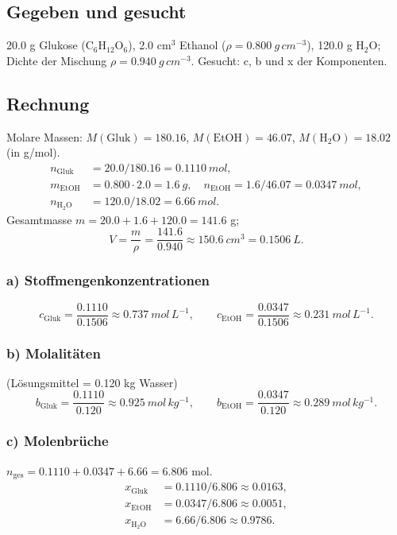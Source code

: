 
\subsection*{Gegeben und gesucht}
20.0 g Glukose (C$_6$H$_{12}$O$_6$), 2.0 cm$^3$ Ethanol
($\rho=0.800\ g\,cm^{-3}$), 120.0 g H$_2$O; Dichte der Mischung
$\rho=0.940\ g\,cm^{-3}$. Gesucht: c, b und x der Komponenten.

\subsection*{Rechnung}
Molare Massen: $M(\text{Gluk}){=}180.16$, $M(\text{EtOH}){=}46.07$,
$M(\text{H}_2\text{O}){=}18.02$ (in g/mol).
\begin{align*}
n_{\text{Gluk}} &= 20.0/180.16 = 0.1110\ mol,\\
m_{\text{EtOH}} &= 0.800\cdot2.0 = 1.6\ g,
  \quad n_{\text{EtOH}} = 1.6/46.07 = 0.0347\ mol,\\
n_{\text{H}_2\text{O}} &= 120.0/18.02 = 6.66\ mol.
\end{align*}
Gesamtmasse $m=20.0+1.6+120.0 = 141.6$ g;
\[
  V = \frac{m}{\rho} = \frac{141.6}{0.940} \approx 150.6\ cm^3
    = 0.1506\ L.
\]

\subsubsection*{a) Stoffmengenkonzentrationen}
\[
  c_{\text{Gluk}} = \frac{0.1110}{0.1506} \approx 0.737\ mol\,L^{-1},
  \qquad
  c_{\text{EtOH}} = \frac{0.0347}{0.1506} \approx 0.231\ mol\,L^{-1}.
\]

\subsubsection*{b) Molalitäten} (Lösungsmittel = 0.120 kg Wasser)
\[
  b_{\text{Gluk}} = \frac{0.1110}{0.120} \approx 0.925\ mol\,kg^{-1},
  \qquad
  b_{\text{EtOH}} = \frac{0.0347}{0.120} \approx 0.289\ mol\,kg^{-1}.
\]

\subsubsection*{c) Molenbrüche}
$n_{\text{ges}} = 0.1110+0.0347+6.66 = 6.806$ mol.
\begin{align*}
x_{\text{Gluk}} &= 0.1110/6.806 \approx 0.0163,\\
x_{\text{EtOH}} &= 0.0347/6.806 \approx 0.0051,\\
x_{\text{H}_2\text{O}} &= 6.66/6.806 \approx 0.9786.
\end{align*}

